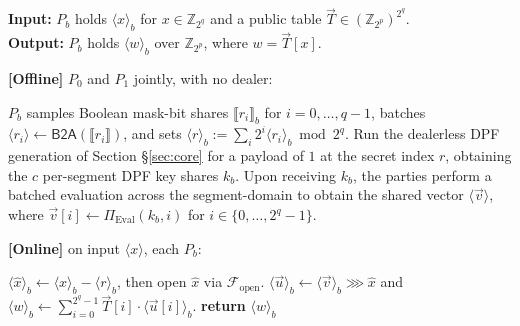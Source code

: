 \documentclass[journal]{IEEEtran}
\theoremstyle{definition}
\theoremstyle{plain}
\newcommand{\Z}{\mathbb{Z}}
\newcommand{\ashare}[1]{\langle #1 \rangle}             %
\newcommand{\bshare}[1]{\llbracket #1 \rrbracket}        %
\newcommand{\nseg}{c}                              %
\begin{document}
\begin{algorithm}[h]
  \caption{Dealerless lookup table ($\Pi_{\mathsf{LUT}}$)}
  \label{alg:LUT}
  \textbf{Input:} $P_b$ holds $\ashare{x}_b$ for $x\in\Z_{2^q}$ and a public table $\vec{T}\in(\Z_{2^p})^{2^q}$. \\
  \textbf{Output:} $P_b$ holds $\ashare{w}_b$ over $\Z_{2^p}$, where $w = \vec{T}[x]$.

  \vspace{0.3em}
  \textbf{[Offline]} $P_0$ and $P_1$ jointly, with no dealer:
  \begin{algorithmic}[1]
    \State $P_b$ samples Boolean mask-bit shares $\bshare{r_i}_b$ for
    $i=0,\ldots,q-1$, batches
    $\ashare{r_i}\gets\mathsf{B2A}(\bshare{r_i})$, and sets
    $\ashare r_b:=\sum_i2^i\ashare{r_i}_b\bmod 2^q$.
    \State Run the dealerless DPF generation of Section \S\ref{sec:core} for a 
    payload of $1$ at the secret index $r$, obtaining the $\nseg$ per-segment DPF key shares $k_b$.
    \State Upon receiving $k_b$, the parties perform a batched
    evaluation across the segment-domain to obtain the shared 
    vector $\ashare{\vec{v}}$, where 
    $\vec{v}[i] \leftarrow \Pi_{\mathrm{Eval}}(k_b, i)$ 
    for $i \in \{0, \dots, 2^q-1\}$.
  \end{algorithmic}

  \vspace{0.3em}
  \textbf{[Online]} on input $\ashare{x}$, each $P_b$:
  \begin{algorithmic}[1]
    \State $\ashare{\hat{x}}_b \gets \ashare{x}_b - \ashare{r}_b$, then open $\hat{x}$ via $\mathcal{F}_{\mathrm{open}}$. 
    \State $\ashare{\vec u}_b \gets \ashare{\vec v}_b \ggg \hat{x}$ \quad and \quad $\ashare{w}_b \gets \sum_{i=0}^{2^q-1} \vec{T}[i]\cdot\ashare{\vec u[i]}_b$. 
    \State \textbf{return} $\ashare{w}_b$
  \end{algorithmic}
\end{algorithm}
\end{document}
